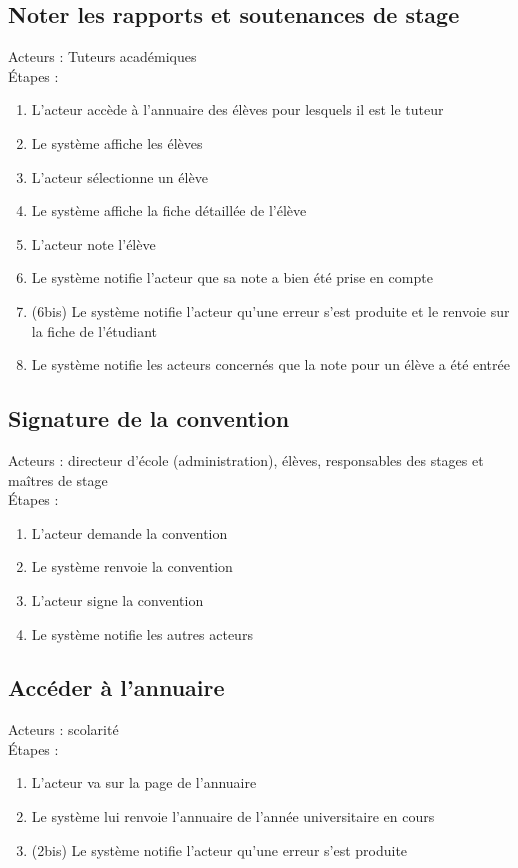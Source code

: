 \documentclass{scrreprt}
\begin{document}
\subsection{Noter les rapports et soutenances de stage}
Acteurs : Tuteurs académiques
\\
\'Etapes : 
\begin{enumerate}
\item L’acteur accède à l’annuaire des élèves pour lesquels il est le tuteur
\item Le système affiche les élèves
\item L’acteur sélectionne un élève
\item Le système affiche la fiche détaillée de l’élève
\item L’acteur note l’élève
\item Le système notifie l’acteur que sa note a bien été prise en compte
\item (6bis) Le système notifie l’acteur qu’une erreur s’est produite et le renvoie sur la fiche de l’étudiant
\item Le système notifie les acteurs concernés que la note pour un élève a été entrée
\end{enumerate}
\subsection{Signature de la convention}
Acteurs : directeur d’\'ecole (administration), \'el\`eves, responsables des stages et ma\^itres de stage
\\
\'Etapes : 
\begin{enumerate}
\item L’acteur demande la convention 
\item Le syst\`eme renvoie la convention
\item L’acteur signe la convention
\item Le syst\`eme notifie les autres acteurs
\end{enumerate}
\subsection{Accéder à l’annuaire}
Acteurs : scolarité
\\
\'Etapes : 
\begin{enumerate}
\item L’acteur va sur la page de l’annuaire
\item Le système lui renvoie l’annuaire de l’année universitaire en cours
\item (2bis) Le système notifie l’acteur qu’une erreur s’est produite
\end{enumerate}
\end{document}
